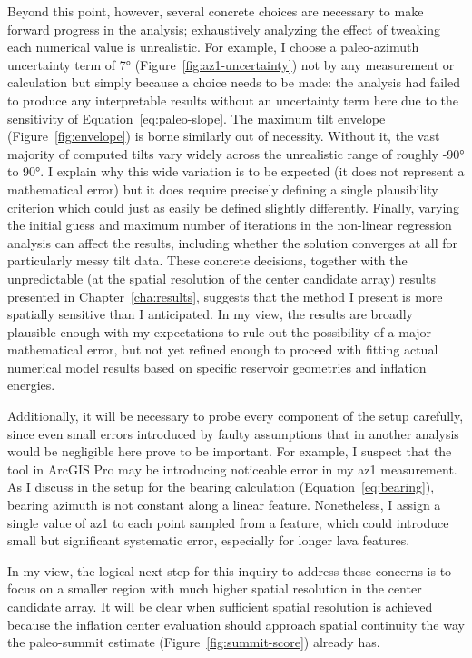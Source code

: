 Beyond this point, however, several concrete choices are necessary to make forward progress in the analysis; exhaustively analyzing the effect of tweaking each numerical value is unrealistic. For example, I choose a paleo-azimuth uncertainty term of \ang{7} (Figure~\ref{fig:az1-uncertainty}) not by any measurement or calculation but simply because a choice needs to be made: the analysis had failed to produce any interpretable results without an uncertainty term here due to the sensitivity of Equation~\eqref{eq:paleo-slope}. The maximum tilt envelope (Figure~\ref{fig:envelope}) is borne similarly out of necessity. Without it, the vast majority of computed tilts vary widely across the unrealistic range of roughly \ang{-90} to \ang{90}. I explain why this wide variation is to be expected (it does not represent a mathematical error) but it does require precisely defining a single plausibility criterion which could just as easily be defined slightly differently. Finally, varying the initial guess and maximum number of iterations in the non-linear regression analysis can affect the results, including whether the solution converges at all for particularly messy tilt data. These concrete decisions, together with the unpredictable (at the spatial resolution of the center candidate array) results presented in Chapter~\ref{cha:results}, suggests that the method I present is more spatially sensitive than I anticipated. In my view, the results are broadly plausible enough with my expectations to rule out the possibility of a major mathematical error, but not yet refined enough to proceed with fitting actual numerical model results based on specific reservoir geometries and inflation energies.

Additionally, it will be necessary to probe every component of the setup carefully, since even small errors introduced by faulty assumptions that in another analysis would be negligible here prove to be important. For example, I suspect that the  tool in ArcGIS Pro may be introducing noticeable error in my \acl{az1} measurement. As I discuss in the setup for the \acs{bearing} calculation (Equation~\eqref{eq:bearing}), bearing azimuth is not constant along a linear feature. Nonetheless, I assign a single value of \acs{az1} to each point sampled from a feature, which could introduce small but significant systematic error, especially for longer lava features.

In my view, the logical next step for this inquiry to address these concerns is to focus on a smaller region with much higher spatial resolution in the center candidate array. It will be clear when sufficient spatial resolution is achieved because the inflation center evaluation should approach spatial continuity the way the paleo-summit estimate (Figure~\ref{fig:summit-score}) already has.

